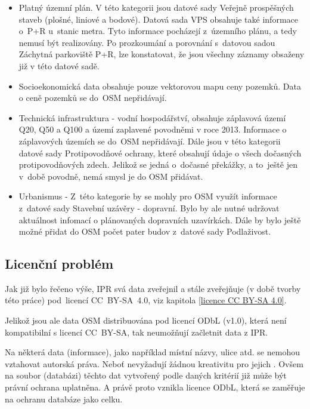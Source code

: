 \begin{itemize}
    \item   Platný územní plán. V této kategorii jsou datové sady
            Veřejně prospěšných staveb (plošné, liniové a bodové).
            Datová sada VPS obsahuje také informace o~P+R u~stanic
            metra. Tyto informace pocházejí z~územního plánu, a tedy nemusí být
            realizovány. Po prozkoumání a porovnání s~datovou sadou
            Záchytná parkoviště P+R, lze konstatovat, že jsou všechny záznamy obsaženy již v této datové sadě.

    \item   Socioekonomická data obsahuje pouze vektorovou mapu ceny
            pozemků. Data o ceně pozemků se do~OSM nepřidávají. 

    \item   Technická infrastruktura - vodní hospodářství, obsahuje
            záplavová území Q20, Q50 a Q100 a území zaplavené
            povodněmi v roce 2013. Informace o záplavových územích se do~OSM
            nepřidávají. Dále jsou v této kategorii datové sady
            Protipovodňové ochrany, které obsahují údaje o všech dočasných
            protipovodňových zdech. Jelikož se jedná o~dočasné překážky, a to~ještě jen v~době povodně, nemá smysl je do OSM přidávat.

    \item   Urbanismus - Z~této kategorie by se mohly pro OSM využít
            informace z~datové sady
            Stavební uzávěry - dopravní. Bylo by ale nutné udržovat
            aktuálnost infomací o plánovaných dopravních uzavírkách.
            Dále by bylo ještě možné přidat do OSM počet pater budov
            z~datové sady Podlaživost.
\end{itemize}


\subsection{Licenční problém}
\label{Licenční problém}
Jak již bylo řečeno výše, IPR svá data zveřejnil a stále zveřejňuje
(v době tvorby této práce) pod~licencí CC~BY-SA~4.0, viz kapitola \ref{licence CC BY-SA 4.0}.

Jelikož jsou ale data OSM distribuována pod licencí ODbL (v1.0),
která není kompatibilní s licencí CC~BY-SA, tak neumožňují začletnit data z IPR. 

Na některá data (informace), jako například místní názvy, ulice atd.
se nemohou vztahovat autorská práva. Neboť nevyžadují žádnou 
kreativitu pro jejich . Ovšem na soubor (databázi) těchto dat
vytvořený podle daných kritérií již může být právní
ochrana uplatněna. A právě proto vznikla licence ODbL, která se
zaměřuje na ochranu databáze jako celku.

